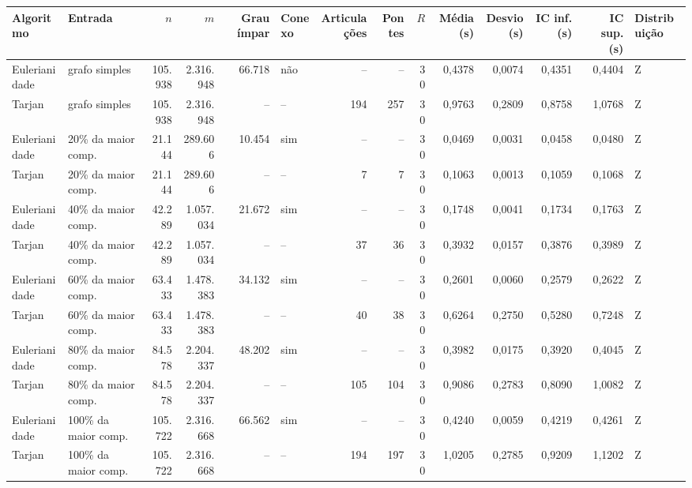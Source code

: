 \begin{tabular}{llrrrlrrrrrrrl}
\toprule
Algoritmo & Entrada & $n$ & $m$ & Grau ímpar & Conexo & Articulações & Pontes & $R$ & Média (s) & Desvio (s) & IC inf. (s) & IC sup. (s) & Distribuição \\
\midrule
Eulerianidade & grafo simples & 105.938 & 2.316.948 & 66.718 & não & -- & -- & 30 & 0,4378 & 0,0074 & 0,4351 & 0,4404 & Z \\
Tarjan & grafo simples & 105.938 & 2.316.948 & -- & -- & 194 & 257 & 30 & 0,9763 & 0,2809 & 0,8758 & 1,0768 & Z \\
Eulerianidade & 20\% da maior comp. & 21.144 & 289.606 & 10.454 & sim & -- & -- & 30 & 0,0469 & 0,0031 & 0,0458 & 0,0480 & Z \\
Tarjan & 20\% da maior comp. & 21.144 & 289.606 & -- & -- & 7 & 7 & 30 & 0,1063 & 0,0013 & 0,1059 & 0,1068 & Z \\
Eulerianidade & 40\% da maior comp. & 42.289 & 1.057.034 & 21.672 & sim & -- & -- & 30 & 0,1748 & 0,0041 & 0,1734 & 0,1763 & Z \\
Tarjan & 40\% da maior comp. & 42.289 & 1.057.034 & -- & -- & 37 & 36 & 30 & 0,3932 & 0,0157 & 0,3876 & 0,3989 & Z \\
Eulerianidade & 60\% da maior comp. & 63.433 & 1.478.383 & 34.132 & sim & -- & -- & 30 & 0,2601 & 0,0060 & 0,2579 & 0,2622 & Z \\
Tarjan & 60\% da maior comp. & 63.433 & 1.478.383 & -- & -- & 40 & 38 & 30 & 0,6264 & 0,2750 & 0,5280 & 0,7248 & Z \\
Eulerianidade & 80\% da maior comp. & 84.578 & 2.204.337 & 48.202 & sim & -- & -- & 30 & 0,3982 & 0,0175 & 0,3920 & 0,4045 & Z \\
Tarjan & 80\% da maior comp. & 84.578 & 2.204.337 & -- & -- & 105 & 104 & 30 & 0,9086 & 0,2783 & 0,8090 & 1,0082 & Z \\
Eulerianidade & 100\% da maior comp. & 105.722 & 2.316.668 & 66.562 & sim & -- & -- & 30 & 0,4240 & 0,0059 & 0,4219 & 0,4261 & Z \\
Tarjan & 100\% da maior comp. & 105.722 & 2.316.668 & -- & -- & 194 & 197 & 30 & 1,0205 & 0,2785 & 0,9209 & 1,1202 & Z \\
\bottomrule
\end{tabular}
